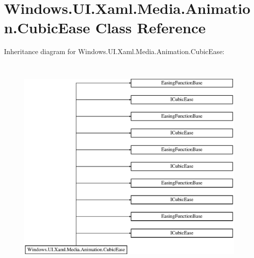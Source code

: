 \hypertarget{class_windows_1_1_u_i_1_1_xaml_1_1_media_1_1_animation_1_1_cubic_ease}{}\section{Windows.\+U\+I.\+Xaml.\+Media.\+Animation.\+Cubic\+Ease Class Reference}
\label{class_windows_1_1_u_i_1_1_xaml_1_1_media_1_1_animation_1_1_cubic_ease}
Inheritance diagram for Windows.\+U\+I.\+Xaml.\+Media.\+Animation.\+Cubic\+Ease\+:\begin{figure}[H]
\begin{center}
\leavevmode
\includegraphics[height=11.000000cm]{class_windows_1_1_u_i_1_1_xaml_1_1_media_1_1_animation_1_1_cubic_ease}
\end{center}
\end{figure}
